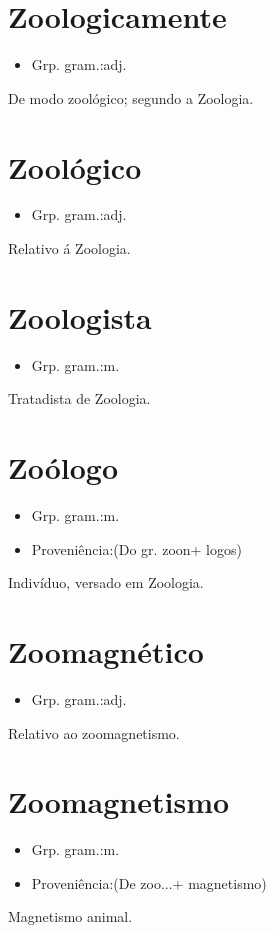 \section{Zoologicamente}
\begin{itemize}
\item {Grp. gram.:adj.}
\end{itemize}
De modo zoológico; segundo a Zoologia.
\section{Zoológico}
\begin{itemize}
\item {Grp. gram.:adj.}
\end{itemize}
Relativo á Zoologia.
\section{Zoologista}
\begin{itemize}
\item {Grp. gram.:m.}
\end{itemize}
Tratadista de Zoologia.
\section{Zoólogo}
\begin{itemize}
\item {Grp. gram.:m.}
\end{itemize}
\begin{itemize}
\item {Proveniência:(Do gr. \textunderscore zoon\textunderscore  + \textunderscore logos\textunderscore )}
\end{itemize}
Indivíduo, versado em Zoologia.
\section{Zoomagnético}
\begin{itemize}
\item {Grp. gram.:adj.}
\end{itemize}
Relativo ao zoomagnetismo.
\section{Zoomagnetismo}
\begin{itemize}
\item {Grp. gram.:m.}
\end{itemize}
\begin{itemize}
\item {Proveniência:(De \textunderscore zoo...\textunderscore  + \textunderscore magnetismo\textunderscore )}
\end{itemize}
Magnetismo animal.
